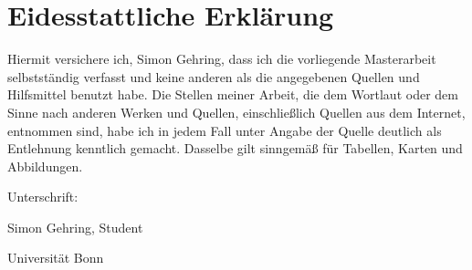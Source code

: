 \pagebreak
\section*{Eidesstattliche Erkl\"arung}
Hiermit versichere ich, Simon Gehring, dass ich die vorliegende Masterarbeit selbstst\"andig verfasst und keine anderen als die angegebenen Quellen und Hilfsmittel benutzt habe. Die Stellen meiner Arbeit, die dem Wortlaut oder dem Sinne nach anderen Werken und Quellen, einschlie\ss{}lich Quellen aus dem Internet, entnommen sind, habe ich in jedem Fall unter Angabe der Quelle deutlich als Entlehnung kenntlich gemacht. Dasselbe gilt sinngem\"a\ss{} f\"ur Tabellen, Karten und Abbildungen.

\vspace*{2cm}
Unterschrift: \hrulefill

\hspace*{0mm}\phantom{Unterschrift: }Simon Gehring, Student

\hspace*{0mm}\phantom{Unterschrift: }Universit\"at Bonn
